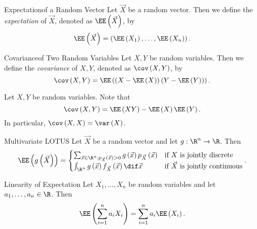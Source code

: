 \documentclass[stat333]{subfiles}
\begin{document}
    \begin{definition}{Expectation}{of a Random Vector}
        Let $\vec{X}$ be a random vector. Then we define the \emph{expectation} of $\vec{X}$, denoted as $\EE\left( \vec{X} \right)$, by
        \begin{equation*}
            \EE\left( \vec{X} \right) = \left( \EE\left( X_1 \right) , \ldots, \EE\left( X_n \right)  \right) .
        \end{equation*}
    \end{definition}

    \begin{definition}{Covariance}{of Two Random Variables}
        Let $X,Y$ be random variables. Then we define the \emph{covariance} of $X,Y$, denoted as $\cov\left( X,Y \right)$, by
        \begin{equation*}
            \cov\left( X,Y \right) = \EE\left( \left( X-\EE\left( X \right)  \right) \left( Y-\EE\left( Y \right)  \right)  \right) .
        \end{equation*}
    \end{definition}

    \np[Covariance]Let $X,Y$ be random variables. Note that
    \begin{equation*}
        \cov\left( X,Y \right) = \EE\left( XY \right) -\EE\left( X \right) \EE\left( Y \right) .
    \end{equation*}
    In particular, $\cov\left( X,X \right) = \var\left( X \right)$.

    \begin{theorem}{Multivariate LOTUS}
        Let $\vec{X}$ be a random vector and let $g:\R^n\to\R$. Then
        \begin{equation*}
            \EE\left( g\left( \vec{X} \right)  \right) =
            \begin{cases} 
                \sum^{}_{\vec{x}\in\R^n:p_{\vec{X}}\left( \vec{x} \right) >0}g\left( \vec{x} \right)p_{\vec{X}} \left( \vec{x} \right) & \text{if $X$ is jointly discrete} \\
                \int^{}_{\R^n}g\left( \vec{x} \right) f_{\vec{X}}\left( \vec{x} \right)\dif\vec{x} & \text{if $\vec{X}$ is jointly continuous} 
            \end{cases}.
        \end{equation*}
    \end{theorem}

    \begin{cor}{Linearity of Expectation}
        Let $X_1,\ldots,X_n$ be random variables and let $a_1,\ldots,a_n\in\R$. Then
        \begin{equation*}
            \EE\left( \sum^{n}_{i=1} a_iX_i \right) = \sum^{n}_{i=1} a_i\EE\left( X_i \right).
        \end{equation*}
    \end{cor}	
\end{document}
